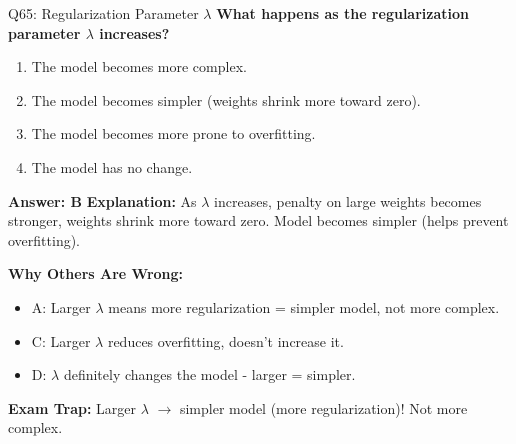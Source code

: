 \documentclass[8pt]{beamer}
\begin{document}
	\begin{frame}{Q65: Regularization Parameter $\lambda$}
		\fontsize{6.5}{7.5}\selectfont
		\textbf{What happens as the regularization parameter $\lambda$ increases?}
		
		\begin{enumerate}
			\item The model becomes more complex.
			\item The model becomes simpler (weights shrink more toward zero).
			\item The model becomes more prone to overfitting.
			\item The model has no change.
		\end{enumerate}
		
		\vspace{0.05cm}
		\textcolor{myblue}{\textbf{Answer: B}}
		\vspace{0.05cm}
		\textcolor{myblue}{\textbf{Explanation:}} As $\lambda$ increases, penalty on large weights becomes stronger, weights shrink more toward zero. Model becomes simpler (helps prevent overfitting).
		
		\vspace{0.05cm}
		\textcolor{myred}{\textbf{Why Others Are Wrong:}}
		\begin{itemize}
			\item \textcolor{myred}{A:} Larger $\lambda$ means more regularization = simpler model, not more complex.
			\item \textcolor{myred}{C:} Larger $\lambda$ reduces overfitting, doesn't increase it.
			\item \textcolor{myred}{D:} $\lambda$ definitely changes the model - larger = simpler.
		\end{itemize}
		
		\textcolor{myred}{\textbf{Exam Trap:}} Larger $\lambda$ $\rightarrow$ \textcolor{myblue}{simpler model} (more regularization)! Not more complex.
	\end{frame}
	
\end{document}
